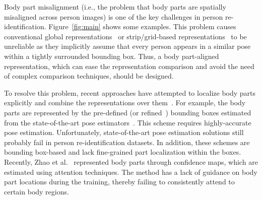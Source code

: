 \documentclass{llncs}
\begin{document}
Body part misalignment (i.e., the problem that body parts are spatially misaligned across person images) is one of the key challenges in person re-identification. Figure~\ref{fig:main} shows some examples. This problem causes conventional global representations~\cite{PaisitkriangkraiSV15,XiaoLOW16,ZhengBSWSWT16,PersonNet2016,chen2016deep,xiaoli2016end} or strip/grid-based representations~\cite{deepreid2014,improved2015,DCSL2016ijcai,deepmetric2014,ChengGZWZ16,VariorSLXW16} to be unreliable as they implicitly assume that every person appears in a similar pose within a tightly surrounded bounding box. Thus, a body part-aligned representation, which can ease the representation comparison and avoid the need of complex comparison techniques, should be designed.

To resolve this problem, recent approaches have attempted to localize body parts explicitly and combine the representations over them~\cite{SuLZXGT17,ZhengHLY17,ZhaoTSSYYWT17,conf/cvpr/li17,ZhaoLZW17}. For example, the body parts are represented by the pre-defined (or refined~\cite{SuLZXGT17}) bounding boxes estimated from the state-of-the-art pose estimators~\cite{ZhengHLY17,SuLZXGT17,conf/cvpr/cao17,ZhaoTSSYYWT17}. This scheme requires highly-accurate pose estimation. Unfortunately, state-of-the-art pose estimation solutions still probably fail in person re-identification datasets.
In addition, these schemes are bounding box-based and lack fine-grained part localization within the boxes.
Recently, Zhao et al.~\cite{ZhaoLZW17} represented body parts through confidence maps, which are estimated using attention techniques. The method has a lack of guidance on body part locations during the training, thereby failing to consistently attend to certain body regions.
\end{document}
